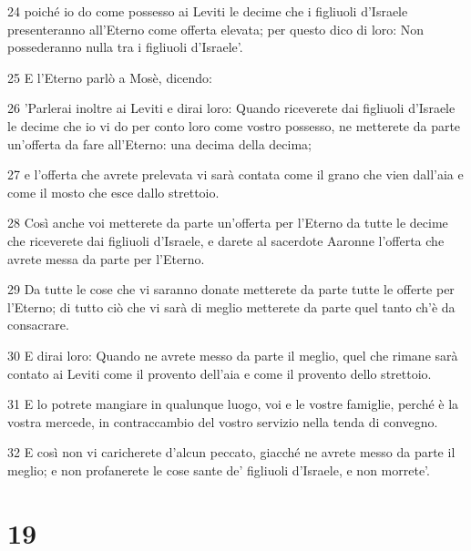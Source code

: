 \par 24 poiché io do come possesso ai Leviti le decime che i figliuoli d'Israele presenteranno all'Eterno come offerta elevata; per questo dico di loro: Non possederanno nulla tra i figliuoli d'Israele'.
\par 25 E l'Eterno parlò a Mosè, dicendo:
\par 26 'Parlerai inoltre ai Leviti e dirai loro: Quando riceverete dai figliuoli d'Israele le decime che io vi do per conto loro come vostro possesso, ne metterete da parte un'offerta da fare all'Eterno: una decima della decima;
\par 27 e l'offerta che avrete prelevata vi sarà contata come il grano che vien dall'aia e come il mosto che esce dallo strettoio.
\par 28 Così anche voi metterete da parte un'offerta per l'Eterno da tutte le decime che riceverete dai figliuoli d'Israele, e darete al sacerdote Aaronne l'offerta che avrete messa da parte per l'Eterno.
\par 29 Da tutte le cose che vi saranno donate metterete da parte tutte le offerte per l'Eterno; di tutto ciò che vi sarà di meglio metterete da parte quel tanto ch'è da consacrare.
\par 30 E dirai loro: Quando ne avrete messo da parte il meglio, quel che rimane sarà contato ai Leviti come il provento dell'aia e come il provento dello strettoio.
\par 31 E lo potrete mangiare in qualunque luogo, voi e le vostre famiglie, perché è la vostra mercede, in contraccambio del vostro servizio nella tenda di convegno.
\par 32 E così non vi caricherete d'alcun peccato, giacché ne avrete messo da parte il meglio; e non profanerete le cose sante de' figliuoli d'Israele, e non morrete'.

\chapter{19}

